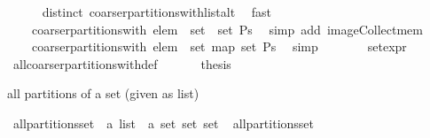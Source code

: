 \begin{isabellebody}
\ \ \ \ \isamarkupfalse%
\ distinct\ coarser{\isacharunderscore}partitions{\isacharunderscore}with{\isacharunderscore}list{\isacharunderscore}alt\ \isamarkupfalse%
\ fast\isanewline
\ \ \isamarkupfalse%
\ \isamarkupfalse%
\ {\isachardoublequoteopen}{\isasymdots}\ {\isacharequal}\ {\isasymUnion}\ {\isacharparenleft}coarser{\isacharunderscore}partitions{\isacharunderscore}with\ elem\ {\isacharbackquote}\ {\isacharparenleft}set\ {\isacharbackquote}\ {\isacharparenleft}set\ Ps{\isacharparenright}{\isacharparenright}{\isacharparenright}{\isachardoublequoteclose}\ \isamarkupfalse%
\ {\isacharparenleft}simp\ add{\isacharcolon}\ image{\isacharunderscore}Collect{\isacharunderscore}mem{\isacharparenright}\isanewline
\ \ \isamarkupfalse%
\ \isamarkupfalse%
\ {\isachardoublequoteopen}{\isasymdots}\ {\isacharequal}\ {\isasymUnion}\ {\isacharparenleft}coarser{\isacharunderscore}partitions{\isacharunderscore}with\ elem\ {\isacharbackquote}\ {\isacharparenleft}set\ {\isacharparenleft}map\ set\ Ps{\isacharparenright}{\isacharparenright}{\isacharparenright}{\isachardoublequoteclose}\ \isamarkupfalse%
\ simp\isanewline
\ \ \isamarkupfalse%
\ \isamarkupfalse%
\ {\isachardoublequoteopen}{\isasymdots}\ {\isacharequal}\ {\isacharquery}set{\isacharunderscore}expr{\isachardoublequoteclose}\ \isamarkupfalse%
\ all{\isacharunderscore}coarser{\isacharunderscore}partitions{\isacharunderscore}with{\isacharunderscore}def\ \isacommand{{\isachardot}{\isachardot}}\isamarkupfalse%
\isanewline
\ \ \isamarkupfalse%
\ \isamarkupfalse%
\ {\isacharquery}thesis\ \isacommand{{\isachardot}}\isamarkupfalse%
\isanewline
{}\isamarkupfalse%
%
\endisatagproof
{\isafoldproof}%
%
\isadelimproof
%
\endisadelimproof
%
\begin{isamarkuptext}%
all partitions of a set (given as list)%
\end{isamarkuptext}%
\isamarkuptrue%
\isamarkupfalse%
\ all{\isacharunderscore}partitions{\isacharunderscore}set\ {\isacharcolon}{\isacharcolon}\ {\isachardoublequoteopen}{\isacharprime}a\ list\ {\isasymRightarrow}\ {\isacharprime}a\ set\ set\ set{\isachardoublequoteclose}\isanewline
{}\ \isanewline
{\isachardoublequoteopen}all{\isacharunderscore}partitions{\isacharunderscore}set\ {\isacharbrackleft}{\isacharbrackright}\ {\isacharequal}\ {\isacharbraceleft}{\isacharbraceleft}{\isacharbraceright}{\isacharbraceright}{\isachardoublequoteclose}\ {\isacharbar}\isanewline

\end{isabellebody}
